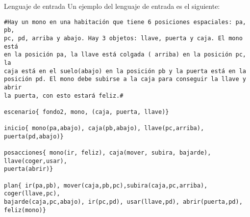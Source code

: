 \documentclass[11pt,a4paper,spanish,twoside]{book}
\makeatletter
\renewcommand{\section}{
  \@startsection{section}{1}{0mm}{\baselineskip}
  {2.5mm}{\Large\bf}
}
\theoremstyle{plain} \newtheorem{nota}{Nota}
\makeatother
\begin{document}
\section{Lenguaje de entrada}
Un ejemplo del lenguaje de entrada es el siguiente:
\begin{verbatim}
#Hay un mono en una habitación que tiene 6 posiciones espaciales: pa, pb, 
pc, pd, arriba y abajo. Hay 3 objetos: llave, puerta y caja. El mono está 
en la posición pa, la llave está colgada ( arriba) en la posición pc, la 
caja está en el suelo(abajo) en la posición pb y la puerta está en la 
posición pd. El mono debe subirse a la caja para conseguir la llave y abrir 
la puerta, con esto estará feliz.#

escenario{ fondo2, mono, (caja, puerta, llave)}

inicio{ mono(pa,abajo), caja(pb,abajo), llave(pc,arriba), puerta(pd,abajo)}

posacciones{ mono(ir, feliz), caja(mover, subira, bajarde), llave(coger,usar), 
puerta(abrir)}

plan{ ir(pa,pb), mover(caja,pb,pc),subira(caja,pc,arriba), coger(llave,pc), 
bajarde(caja,pc,abajo), ir(pc,pd), usar(llave,pd), abrir(puerta,pd), 
feliz(mono)}
\end{verbatim}
\end{document}
